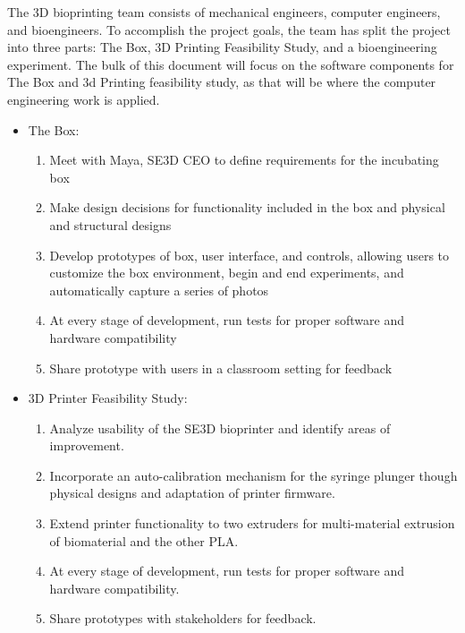 The 3D bioprinting team consists of mechanical engineers, computer engineers, and bioengineers. To accomplish the project goals, the team has split the project into three parts: The Box, 3D Printing Feasibility Study, and a bioengineering experiment. The bulk of this document will focus on the software components for The Box and 3d Printing feasibility study, as that will be where the computer engineering work is applied.
\begin{itemize}
	\item  The Box:
	\begin{enumerate}
		\item Meet with Maya, SE3D CEO to define requirements for the incubating box
		\item Make design decisions for functionality included in the box and physical and structural designs
		\item Develop prototypes of box, user interface, and controls, allowing users to customize the box environment, begin and end experiments, and automatically capture a series of photos
		\item At every stage of development, run tests for proper software and hardware compatibility
		\item Share prototype with users in a classroom setting for feedback
	\end{enumerate}
	\item 3D Printer Feasibility Study:
	\begin{enumerate}
		\item Analyze usability of the SE3D bioprinter and identify areas of improvement.

		\item Incorporate an auto-calibration mechanism for the syringe plunger though physical designs and adaptation of printer firmware.

		\item Extend printer functionality to two extruders for multi-material extrusion of biomaterial and the other PLA.

		\item At every stage of development, run tests for proper software and hardware compatibility.

		\item Share prototypes with stakeholders for feedback.
	\end{enumerate}
\end{itemize}